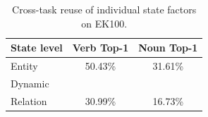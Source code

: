 \begin{table}[t]
\centering
\caption{Cross-task reuse of individual state factors on EK100.}
\label{tab:layer-transfer}
\small
\renewcommand{\arraystretch}{1.05}
\begin{tabularx}{0.70\linewidth}{@{}Lcc@{}}
\toprule\toprule
\textbf{State level} & \textbf{Verb Top-1} & \textbf{Noun Top-1} \\
\midrule
Entity & 50.43\% & 31.61\% \\
Dynamic &  &  \\
Relation & 30.99\% & 16.73\% \\
\bottomrule\bottomrule
\end{tabularx}
\end{table}
